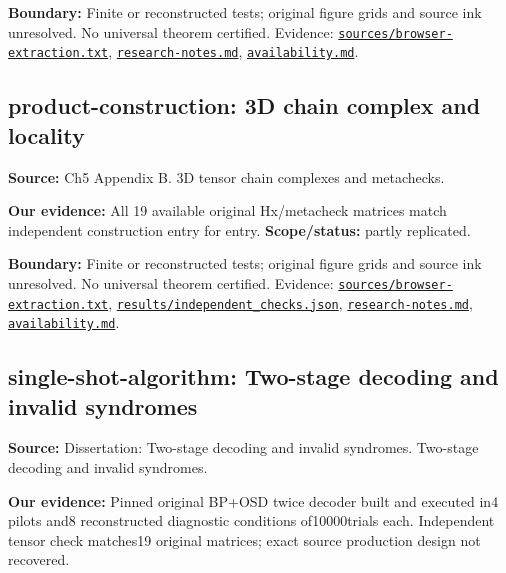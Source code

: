 \documentclass[11pt]{article}
\begin{document}
\textbf{Boundary:} Finite or reconstructed tests; original figure grids and source ink unresolved. No universal theorem certified. Evidence: \href{https://github.com/alectionary/vibe-math/blob/master/formalization/quintavalle-hgp/sources/browser-extraction.txt}{\nolinkurl{sources/browser-extraction.txt}}, \href{https://github.com/alectionary/vibe-math/blob/master/formalization/quintavalle-hgp/research-notes.md}{\nolinkurl{research-notes.md}}, \href{https://github.com/alectionary/vibe-math/blob/master/formalization/quintavalle-hgp/availability.md}{\nolinkurl{availability.md}}.
\subsection{product-construction: 3D chain complex and locality}
\label{claim:product-construction}
\textbf{Source:} Ch5 Appendix B. 3D tensor chain complexes and metachecks.

\textbf{Our evidence:} All 19 available original Hx/metacheck matrices match independent construction entry for entry. \textbf{Scope/status:} partly replicated.

\textbf{Boundary:} Finite or reconstructed tests; original figure grids and source ink unresolved. No universal theorem certified. Evidence: \href{https://github.com/alectionary/vibe-math/blob/master/formalization/quintavalle-hgp/sources/browser-extraction.txt}{\nolinkurl{sources/browser-extraction.txt}}, \href{https://github.com/alectionary/vibe-math/blob/master/formalization/quintavalle-hgp/results/independent_checks.json}{\nolinkurl{results/independent_checks.json}}, \href{https://github.com/alectionary/vibe-math/blob/master/formalization/quintavalle-hgp/research-notes.md}{\nolinkurl{research-notes.md}}, \href{https://github.com/alectionary/vibe-math/blob/master/formalization/quintavalle-hgp/availability.md}{\nolinkurl{availability.md}}.
\subsection{single-shot-algorithm: Two-stage decoding and invalid syndromes}
\label{claim:single-shot-algorithm}
\textbf{Source:} Dissertation: Two-stage decoding and invalid syndromes. Two-stage decoding and invalid syndromes.

\textbf{Our evidence:} Pinned original BP+OSD twice decoder built and executed in4 pilots and8 reconstructed diagnostic conditions of10000trials each. Independent tensor check matches19 original matrices; exact source production design not recovered.
\end{document}
